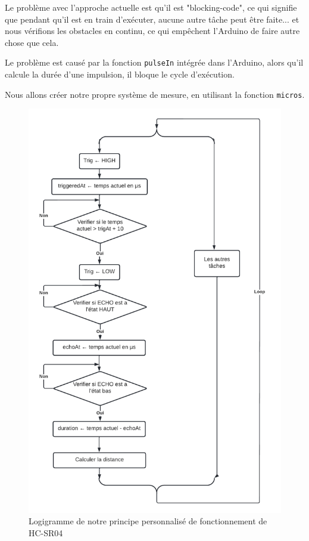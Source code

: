 Le problème avec l’approche actuelle est qu’il est "blocking-code", ce qui signifie que pendant qu’il est en train d'exécuter, aucune autre tâche peut être faite... et nous vérifions les obstacles en continu, ce qui empêchent l’Arduino de faire autre chose que cela.

Le problème est causé par la fonction \verb|pulseIn| intégrée dans l’Arduino, alors qu’il calcule la durée d’une impulsion, il bloque le cycle d’exécution.

Nous allons créer notre propre système de mesure, en utilisant la fonction \verb|micros|.

\begin{figure}[!htbp]
    \centering
    \includegraphics[height=.8\textheight]{assets/HC-SR04/our working principal.png}
    \caption{Logigramme de notre principe personnalisé de fonctionnement de HC-SR04}
\end{figure}

